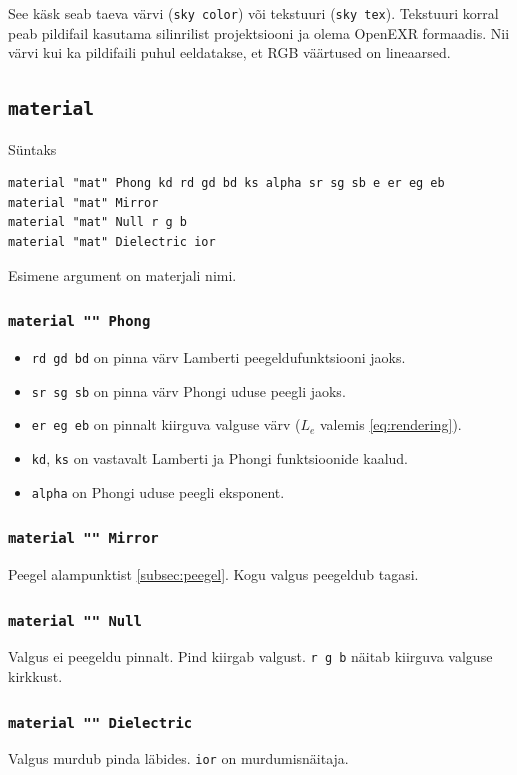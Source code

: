 \documentclass[a4paper,12pt]{report}
\begin{document}
See käsk seab taeva värvi (\texttt{sky color}) või tekstuuri (\texttt{sky tex}).
Tekstuuri korral peab pildifail kasutama silinrilist projektsiooni ja olema
OpenEXR formaadis. Nii värvi kui ka pildifaili puhul eeldatakse, et RGB
väärtused on lineaarsed.

\subsection{\texttt{material}}
Süntaks
\begin{verbatim}
material "mat" Phong kd rd gd bd ks alpha sr sg sb e er eg eb
material "mat" Mirror
material "mat" Null r g b
material "mat" Dielectric ior
\end{verbatim}

Esimene argument on materjali nimi.

\subsubsection{\texttt{material "{}"{} Phong}}
\begin{itemize}
\item \texttt{rd gd bd} on pinna värv Lamberti peegeldufunktsiooni jaoks.
\item \texttt{sr sg sb} on pinna värv Phongi uduse peegli jaoks.
\item \texttt{er eg eb} on pinnalt kiirguva valguse värv (\(L_e\) valemis \ref{eq:rendering}).
\item \texttt{kd}, \texttt{ks} on vastavalt Lamberti ja Phongi funktsioonide kaalud.
\item \texttt{alpha} on Phongi uduse peegli eksponent.
\end{itemize}

\subsubsection{\texttt{material "{}"{} Mirror}}
Peegel alampunktist \ref{subsec:peegel}. Kogu valgus peegeldub tagasi.

\subsubsection{\texttt{material "{}"{} Null}}
Valgus ei peegeldu pinnalt. Pind kiirgab valgust. \texttt{r g b} näitab
kiirguva valguse kirkkust.

\subsubsection{\texttt{material "{}"{} Dielectric}}
Valgus murdub pinda läbides. \texttt{ior} on murdumisnäitaja.
\end{document}

